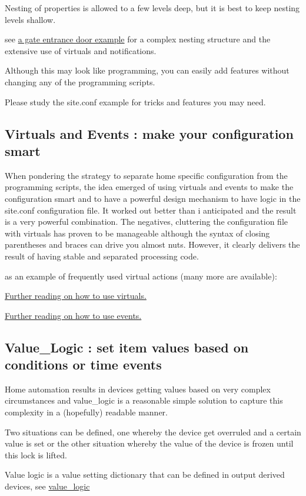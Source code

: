 Nesting of properties is allowed to a few levels deep, but it is best to
keep nesting levels shallow.

see \href{docs/door.md}{a gate entrance door example} for a complex
nesting structure and the extensive use of virtuals and notifications.

Although this may look like programming, you can easily add features
without changing any of the programming scripts.

Please study the site.conf example for tricks and features you may need.

\subsection{Virtuals and Events : make your configuration smart}

When pondering the strategy to separate home specific configuration from
the programming scripts, the idea emerged of using virtuals and events
to make the configuration smart and to have a powerful design mechanism
to have logic in the site.conf configuration file. It worked out better
than i anticipated and the result is a very powerful combination. The
negatives, cluttering the configuration file with virtuals has proven to
be manageable although the syntax of closing parentheses and braces can
drive you almost nuts. However, it clearly delivers the result of having
stable and separated processing code.

as an example of frequently used virtual actions (many more are
available):


\href{docs/Virtual.md}{Further reading on how to use virtuals.}

\href{docs/Event.md}{Further reading on how to use events.}

\subsection{Value\_Logic : set item values based on conditions or time
events}

Home automation results in devices getting values based on very complex
circumstances and value\_logic is a reasonable simple solution to
capture this complexity in a (hopefully) readable manner.

Two situations can be defined, one whereby the device get overruled and
a certain value is set or the other situation whereby the value of the
device is frozen until this lock is lifted.

Value logic is a value setting dictionary that can be defined in output
derived devices, see \href{docs/value_logic.md}{value\_logic}

